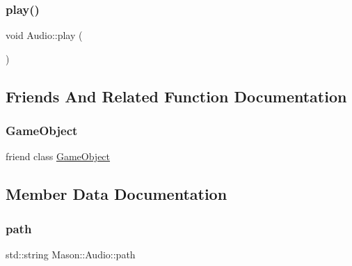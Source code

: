 \hypertarget{class_mason_1_1_audio_a2916f9015031bee9abb98adf0d83e7ee}{}\label{class_mason_1_1_audio_a2916f9015031bee9abb98adf0d83e7ee} 
\subsubsection{\texorpdfstring{play()}{play()}}
{\footnotesize\ttfamily void Audio\+::play (\begin{DoxyParamCaption}{ }\end{DoxyParamCaption})}



\subsection{Friends And Related Function Documentation}
\hypertarget{class_mason_1_1_audio_a00df87c957d8f7ee0fc51f07a0542f4a}{}\label{class_mason_1_1_audio_a00df87c957d8f7ee0fc51f07a0542f4a} 
\subsubsection{\texorpdfstring{Game\+Object}{GameObject}}
{\footnotesize\ttfamily friend class \hyperlink{class_mason_1_1_game_object}{Game\+Object}\hspace{0.3cm}{\ttfamily [friend]}}



\subsection{Member Data Documentation}
\hypertarget{class_mason_1_1_audio_a762cc6174ce20a011fe1e3a36e649204}{}\label{class_mason_1_1_audio_a762cc6174ce20a011fe1e3a36e649204} 
\subsubsection{\texorpdfstring{path}{path}}
{\footnotesize\ttfamily std\+::string Mason\+::\+Audio\+::path}

\hypertarget{class_mason_1_1_audio_a100d9da58685f865bf03dcf44a55fb63}{}\label{class_mason_1_1_audio_a100d9da58685f865bf03dcf44a55fb63} 
